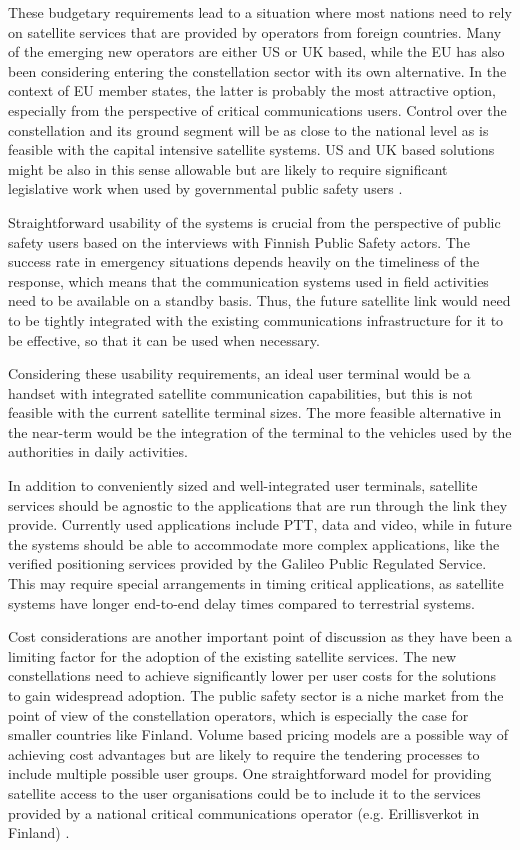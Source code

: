 \documentclass[english, 12pt, a4paper, elec, utf8, a-1b, online]{aaltothesis}
\begin{document}
These budgetary requirements lead to a situation where most nations need to rely on satellite services that are provided by operators from foreign countries.
Many of the emerging new operators are either US or UK based, while the EU has also been considering entering the constellation sector with its own alternative.
In the context of EU member states, the latter is probably the most attractive option, especially from the perspective of critical communications users.
Control over the constellation and its ground segment will be as close to the national level as is feasible with the capital intensive satellite systems.
US and UK based solutions might be also in this sense allowable but are likely to require significant legislative work when used by governmental public safety users \cite{snellman2022european}.

Straightforward usability of the systems is crucial from the perspective of public safety users based on the interviews with Finnish Public Safety actors.
The success rate in emergency situations depends heavily on the timeliness of the response, which means that the communication systems used in field activities need to be available on a standby basis.
Thus, the future satellite link would need to be tightly integrated with the existing communications infrastructure for it to be effective, so that it can be used when necessary.

Considering these usability requirements, an ideal user terminal would be a handset with integrated satellite communication capabilities, but this is not feasible with the current satellite terminal sizes. The more feasible alternative in the near-term would be the integration of the terminal to the vehicles used by the authorities in daily activities.

In addition to conveniently sized and well-integrated user terminals, satellite services should be agnostic to the applications that are run through the link they provide. Currently used applications include PTT, data and video, while in future the systems should be able to accommodate more complex applications, like the verified positioning services provided by the Galileo Public Regulated Service. This may require special arrangements in timing critical applications, as satellite systems have longer end-to-end delay times compared to terrestrial systems.

Cost considerations are another important point of discussion as they have been a limiting factor for the adoption of the existing satellite services.
The new constellations need to achieve significantly lower per user costs for the solutions to gain widespread adoption.
The public safety sector is a niche market from the point of view of the constellation operators, which is especially the case for smaller countries like Finland.
Volume based pricing models are a possible way of achieving cost advantages but are likely to require the tendering processes to include multiple possible user groups.
One straightforward model for providing satellite access to the user organisations could be to include it to the services provided by a national critical communications operator (e.g. Erillisverkot in Finland) \cite{saynevirta2021satellite}.
\end{document}

